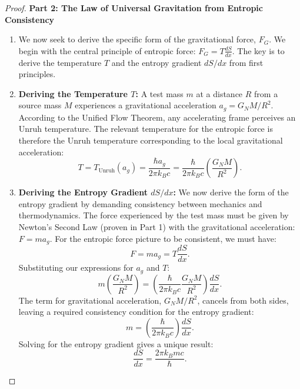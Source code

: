 \documentclass[11pt, letterpaper]{report}
\theoremstyle{plain} %
\theoremstyle{definition} %
\theoremstyle{remark} %
\begin{document}
\begin{proof}
\textbf{Part 2: The Law of Universal Gravitation from Entropic Consistency}
\begin{enumerate}
    \item We now seek to derive the specific form of the gravitational force, $F_G$. We begin with the central principle of entropic force: $F_G = T \frac{dS}{dx}$. The key is to derive the temperature $T$ and the entropy gradient $dS/dx$ from first principles.

    \item \textbf{Deriving the Temperature $T$:} A test mass $m$ at a distance $R$ from a source mass $M$ experiences a gravitational acceleration $a_g = G_N M/R^2$. According to the Unified Flow Theorem, any accelerating frame perceives an Unruh temperature. The relevant temperature for the entropic force is therefore the Unruh temperature corresponding to the local gravitational acceleration:
    \begin{equation}
        T = T_{\text{Unruh}}(a_g) = \frac{\hbar a_g}{2\pi k_B c} = \frac{\hbar}{2\pi k_B c} \left(\frac{G_N M}{R^2}\right).
        \label{eq:unruh_temp_gravity}
    \end{equation}

    \item \textbf{Deriving the Entropy Gradient $dS/dx$:} We now derive the form of the entropy gradient by demanding consistency between mechanics and thermodynamics. The force experienced by the test mass must be given by Newton's Second Law (proven in Part 1) with the gravitational acceleration: $F = m a_g$. For the entropic force picture to be consistent, we must have:
    $$ F = m a_g = T \frac{dS}{dx}. $$
    Substituting our expressions for $a_g$ and $T$:
    $$ m \left(\frac{G_N M}{R^2}\right) = \left( \frac{\hbar}{2\pi k_B c} \frac{G_N M}{R^2} \right) \frac{dS}{dx}. $$
    The term for gravitational acceleration, $G_N M/R^2$, cancels from both sides, leaving a required consistency condition for the entropy gradient:
    $$ m = \left( \frac{\hbar}{2\pi k_B c} \right) \frac{dS}{dx}. $$
    Solving for the entropy gradient gives a unique result:
    \begin{equation}
        \frac{dS}{dx} = \frac{2\pi k_B m c}{\hbar}.
        \label{eq:derived_entropy_gradient}
    \end{equation}


\end{enumerate}
\end{proof}
\end{document}
